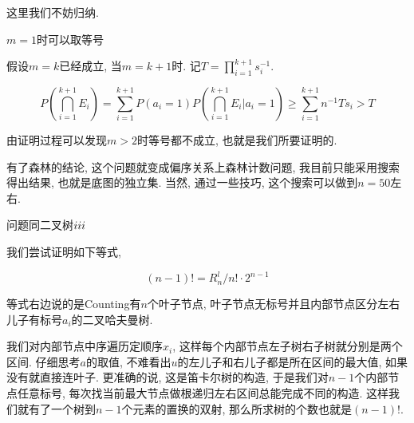 \begin{prob} [概率链]
		这里我们不妨归纳.
		
		$m = 1$时可以取等号
		
		假设$m = k$已经成立, 当$m = k + 1$时. 记$T = \prod\limits_{i = 1}^{k+1}s_i^{-1}$. 
		
		\begin{equation*}
			P(\bigcap\limits_{i=1}^{k+1}E_i) 
			= \sum\limits_{i=1}^{k+1}P(a_i=1)P(\bigcap\limits_{i=1}^{k+1}E_i|a_i=1)
			\geq \sum\limits_{i=1}^{k+1}n^{-1}Ts_i
			> T
		\end{equation*}
		
		由证明过程可以发现$m>2$时等号都不成立, 也就是我们所要证明的.
		
		有了森林的结论, 这个问题就变成偏序关系上森林计数问题, 我目前只能采用搜索得出结果, 也就是底图的独立集. 当然, 通过一些技巧, 这个搜索可以做到$n=50$左右.

	\end{prob}
	
	\begin{prob} [二叉树$\uppercase\expandafter{\romannumeral3}$另解]
	
		问题同二叉树$\uppercase\expandafter{\romannumeral3}$
		
		\sol
		我们尝试证明如下等式, 
		
		\begin{equation*}
			(n - 1)! = R_n^l / n! \cdot 2^{n - 1}
		\end{equation*}
		
		等式右边说的是Counting有$n$个叶子节点, 叶子节点无标号并且内部节点区分左右儿子有标号$a_i$的二叉哈夫曼树.
		
		我们对内部节点中序遍历定顺序$x_i$, 这样每个内部节点左子树右子树就分别是两个区间. 仔细思考$a$的取值, 不难看出$u$的左儿子和右儿子都是所在区间的最大值, 如果没有就直接连叶子. 更准确的说, 这是笛卡尔树的构造, 于是我们对$n - 1$个内部节点任意标号, 每次找当前最大节点做根递归左右区间总能完成不同的构造. 这样我们就有了一个树到$n - 1$个元素的置换的双射, 那么所求树的个数也就是$(n - 1)!$.
	
	\end{prob}

